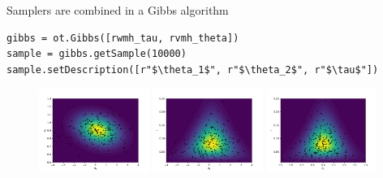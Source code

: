 \documentclass{beamer}
\begin{document}
\begin{frame}[containsverbatim]
\begin{block}{Samplers are combined in a Gibbs algorithm}
\begin{tikzpicture}[
            squarednode/.style={rectangle, draw=green!60, fill=green!5, very thick, minimum size=5mm},
            ]
        \end{tikzpicture}
\vspace{-0.3cm}
        \begin{lstlisting}
gibbs = ot.Gibbs([rwmh_tau, rvmh_theta])
sample = gibbs.getSample(10000)
sample.setDescription([r"$\theta_1$", r"$\theta_2$", r"$\tau$"])
\end{lstlisting}
    \end{block}
\vspace{-0.5cm}
\begin{figure}
\includegraphics[width=0.32\textwidth]{figures/rvmh_blocs_theta_2_theta_1.pdf}
\includegraphics[width=0.32\textwidth]{figures/rvmh_blocs_tau_theta_1.pdf}
\includegraphics[width=0.32\textwidth]{figures/rvmh_blocs_tau_theta_2.pdf}
\end{figure}
\end{frame}

\end{document}
